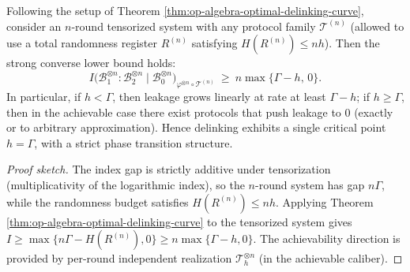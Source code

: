 \begin{theorem}\label{thm:op-algebra-multi-round-strong-converse-linear-leakage}
Following the setup of Theorem \ref{thm:op-algebra-optimal-delinking-curve}, consider an \(n\)-round tensorized system with any protocol family \(\mathcal{T}^{(n)}\) (allowed to use a total randomness register \(R^{(n)}\) satisfying \(H(R^{(n)})\le nh\)).
Then the strong converse lower bound holds:
\[
\boxed{\;
I\bigl(\mathcal{B}_1^{\otimes n}:\mathcal{B}_2^{\otimes n}\mid \mathcal{B}_0^{\otimes n}\bigr)_{\varphi^{\otimes n}\circ\mathcal{T}^{(n)}}
\ \ge\ n\max\{\Gamma-h,\,0\}.\;}
\]
In particular, if \(h<\Gamma\), then leakage grows linearly at rate at least \(\Gamma-h\); if \(h\ge \Gamma\), then in the achievable case there exist protocols that push leakage to \(0\) (exactly or to arbitrary approximation).
Hence delinking exhibits a single critical point \(h=\Gamma\), with a strict phase transition structure.
\end{theorem}
\begin{proof}[Proof sketch]
The index gap is strictly additive under tensorization (multiplicativity of the logarithmic index), so the \(n\)-round system has gap \(n\Gamma\), while the randomness budget satisfies \(H(R^{(n)})\le nh\).
Applying Theorem \ref{thm:op-algebra-optimal-delinking-curve} to the tensorized system gives
\(
I\ge \max\{n\Gamma-H(R^{(n)}),0\}\ge n\max\{\Gamma-h,0\}
\).
The achievability direction is provided by per-round independent realization \(\mathcal{T}_h^{\otimes n}\) (in the achievable caliber). \qedhere
\end{proof}

